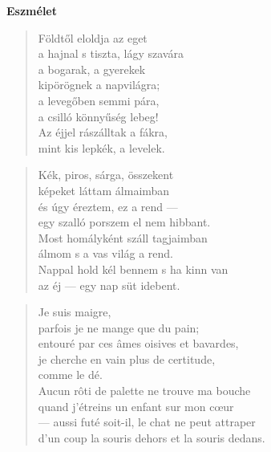 
\begin{center}
  \textbf{\large Eszmélet}
\end{center}


\begin{verse}
  Földtől eloldja az eget \\
  a hajnal s tiszta, lágy szavára \\
  a bogarak, a gyerekek \\
  kipörögnek a napvilágra; \\
  a levegőben semmi pára, \\
  a csilló könnyűség lebeg! \\
  Az éjjel rászálltak a fákra, \\
  mint kis lepkék, a levelek.
\end{verse}

\bigskip


\begin{verse}
  Kék, piros, sárga, összekent \\
  képeket láttam álmaimban \\
  és úgy éreztem, ez a rend --- \\
  egy szalló porszem el nem hibbant. \\
  Most homályként száll tagjaimban \\
  álmom s a vas világ a rend. \\
  Nappal hold kél bennem s ha kinn van \\
  az éj --- egy nap süt idebent.
\end{verse}

\newpage

\vspace*{-15mm}
\centeredornament




\begin{verse}
  Je suis maigre, \\
  parfois je ne mange que du pain; \\
  entouré par ces âmes oisives et bavardes, \\
  je cherche en vain plus de certitude, \\
  comme le dé. \\
  Aucun rôti de palette ne trouve ma bouche \\
  quand j'étreins un enfant sur mon cœur \\
  --- aussi futé soit-il, le chat ne peut attraper \\
  d'un coup la souris dehors et la souris dedans.
\end{verse}

